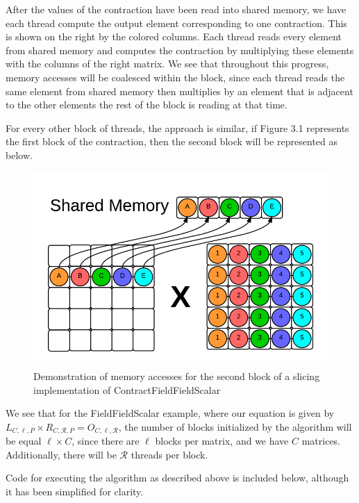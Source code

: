 	After the values of the contraction have been read into shared memory, we have each thread compute the output element corresponding to one contraction. This is shown on the right by the colored columns. Each thread reads every element from shared memory and computes the contraction by multiplying these elements with the columns of the right matrix. We see that throughout this progress, memory accesses will be coalesced within the block, since each thread reads the same element from shared memory then multiplies by an element that is adjacent to the other elements the rest of the block is reading at that time. 
	
	For every other block of threads, the approach is similar, if Figure 3.1 represents the first block of the contraction, then the second block will be represented as below. 

\begin{figure}[b]
    \centering
    \includegraphics[scale = .55]{ContractFieldFieldScalarGraphic2}
    \caption{Demonstration of memory accesses for the second block of a slicing implementation of ContractFieldFieldScalar}
\end{figure}

We see that for the FieldFieldScalar example, where our equation is given by $L_{C,\ell,P} \times R_{C, \mathcal{R}, P} = O_{C,\ell, \mathcal{R}}$, the number of blocks initialized by the algorithm will be equal $\ell \times C$, since there are $\ell$ blocks per matrix, and we have $C$ matrices. Additionally, there will be $\mathcal{R}$ threads per block. 

	Code for executing the algorithm as described above is included below, although it has been simplified for clarity. 

